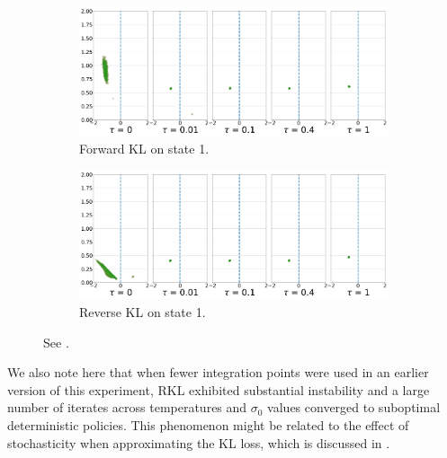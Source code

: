 \documentclass[twoside,11pt]{article}
\begin{document}
\begin{figure}[!htb]
\centering
\begin{subfigure}[b]{0.85\linewidth}
    \centering
    \includegraphics[width=\columnwidth]{figs/continuous-switch-stay/notlearnQ/state1_pi_forward_optim=rmsprop_lr=0.01.png}
    \caption{Forward KL on state 1.}
    \label{fig:cont-switch-stay-forward-s1}
  \end{subfigure}\hspace{15pt}
  
  \begin{subfigure}[b]{0.85\linewidth}
        \centering
        \includegraphics[width=\columnwidth]{figs/continuous-switch-stay/notlearnQ/state1_pi_reverse_optim=rmsprop_lr=0.01.png}
        \caption{Reverse KL on state 1.}
        \label{fig:cont-switch-stay-reverse-s1}
  \end{subfigure}
  \caption{See .}
  \label{fig:final-ss-probs-1}
\end{figure}

We also note here that when fewer integration points were used in an earlier version of this experiment, RKL exhibited substantial instability and a large number of iterates across temperatures and $\sigma_0$ values converged to suboptimal deterministic policies. This phenomenon might be related to the effect of stochasticity when approximating the KL loss, which is discussed in .
\end{document}
